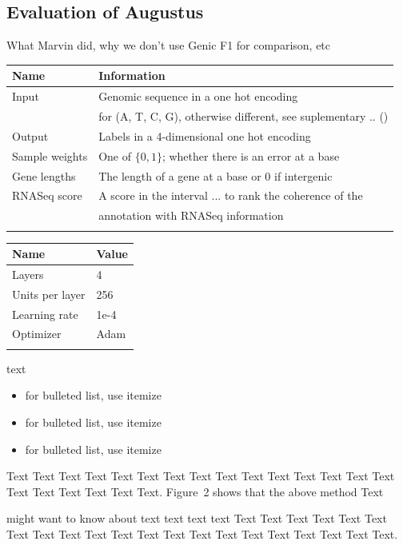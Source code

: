 \documentclass{bioinfo}
\begin{document}
\begin{methods}
\subsection{Evaluation of Augustus} \label{augustus}
What Marvin did, why we don't use Genic F1 for comparison, etc


\begin{table}[!t]
 {
\begin{tabular}{@{}ll@{}}
\toprule Name & Information \\
\midrule
Input & Genomic sequence in a one hot encoding\\
	  & for (A, T, C, G), otherwise different, see suplementary .. ()\\
Output & Labels in a 4-dimensional one hot encoding \\
Sample weights & One of $\{0,1\}$; whether there is an error at a base\\
Gene lengths & The length of a gene at a base or 0 if intergenic \\
RNASeq score & A score in the interval $...$ to rank the coherence of the \\
		     & annotation with RNASeq information \\
\botrule
\end{tabular}}{}
\end{table}

\begin{table}[!t]
 {
\begin{tabular}{@{}ll@{}}
\toprule Name & Value \\
\midrule
Layers & 4\\
Units per layer & 256\\
Learning rate & 1e-4\\
Optimizer & Adam\\
\botrule
\end{tabular}}{}
\end{table}

text\vspace*{1pt}

\begin{itemize}
\item for bulleted list, use itemize
\item for bulleted list, use itemize
\item for bulleted list, use itemize\vspace*{1pt}
\end{itemize}

Text Text Text Text Text Text  Text Text Text Text Text Text Text
Text Text  Text Text Text Text Text Text.
Figure~2\vphantom{\ref{fig:02}} shows that the above method  Text

\citealp{Boffelli03} might want to know about  text text text text
Text Text Text Text Text Text  Text Text Text Text Text Text Text
Text Text  Text Text Text Text Text Text.

\end{methods}
\end{document}
